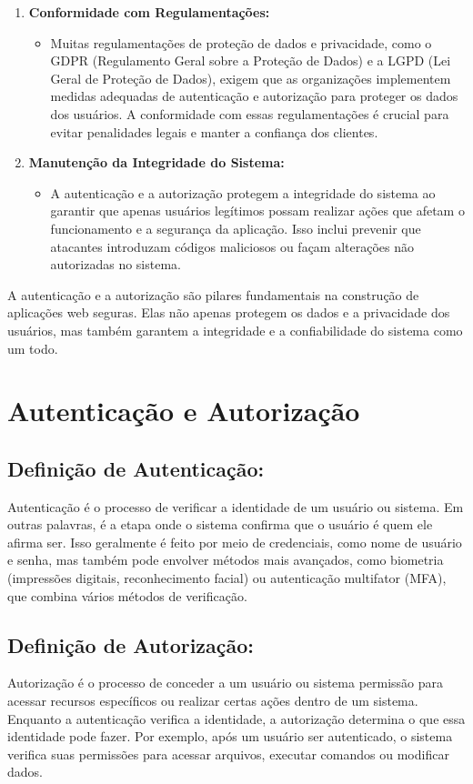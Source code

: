 \documentclass{scrartcl}
\begin{document}
\begin{enumerate}
\item \textbf{\textbf{Conformidade com Regulamentações:}}
\begin{itemize}
\item Muitas regulamentações de proteção de dados e privacidade, como o GDPR
(Regulamento Geral sobre a Proteção de Dados) e a LGPD (Lei Geral de
Proteção de Dados), exigem que as organizações implementem medidas
adequadas de autenticação e autorização para proteger os dados dos
usuários. A conformidade com essas regulamentações é crucial para evitar
penalidades legais e manter a confiança dos clientes.
\end{itemize}

\item \textbf{\textbf{Manutenção da Integridade do Sistema:}}
\begin{itemize}
\item A autenticação e a autorização protegem a integridade do sistema ao
garantir que apenas usuários legítimos possam realizar ações que afetam o
funcionamento e a segurança da aplicação. Isso inclui prevenir que
atacantes introduzam códigos maliciosos ou façam alterações não autorizadas
no sistema.
\end{itemize}
\end{enumerate}

A autenticação e a autorização são pilares fundamentais na construção de
aplicações web seguras. Elas não apenas protegem os dados e a privacidade dos
usuários, mas também garantem a integridade e a confiabilidade do sistema como
um todo.

\section{Autenticação e Autorização}
\label{sec:org5972197}
\subsection{Definição de Autenticação:}
\label{sec:orgd82fc1a}
Autenticação é o processo de verificar a identidade de um usuário ou sistema. Em
outras palavras, é a etapa onde o sistema confirma que o usuário é quem ele
afirma ser. Isso geralmente é feito por meio de credenciais, como nome de
usuário e senha, mas também pode envolver métodos mais avançados, como biometria
(impressões digitais, reconhecimento facial) ou autenticação multifator (MFA),
que combina vários métodos de verificação.

\subsection{Definição de Autorização:}
\label{sec:org5ca1143}
Autorização é o processo de conceder a um usuário ou sistema permissão para
acessar recursos específicos ou realizar certas ações dentro de um sistema.
Enquanto a autenticação verifica a identidade, a autorização determina o que
essa identidade pode fazer. Por exemplo, após um usuário ser autenticado, o
sistema verifica suas permissões para acessar arquivos, executar comandos ou
modificar dados.
\end{document}
